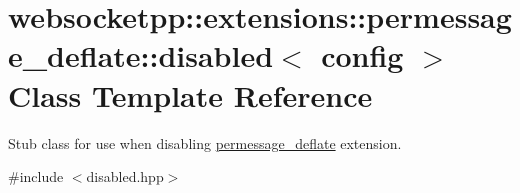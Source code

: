 \hypertarget{classwebsocketpp_1_1extensions_1_1permessage__deflate_1_1disabled}{}\section{websocketpp\+:\+:extensions\+:\+:permessage\+\_\+deflate\+:\+:disabled$<$ config $>$ Class Template Reference}
\label{classwebsocketpp_1_1extensions_1_1permessage__deflate_1_1disabled}


Stub class for use when disabling \hyperlink{namespacewebsocketpp_1_1extensions_1_1permessage__deflate}{permessage\+\_\+deflate} extension.  




{\ttfamily \#include $<$disabled.\+hpp$>$}

